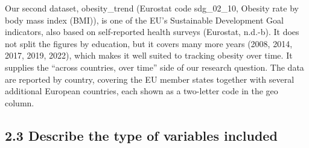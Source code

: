 \documentclass[
]{article}
\begin{document}
Our second dataset, obesity\_trend (Eurostat code sdg\_02\_10, Obesity
rate by body mass index (BMI)), is one of the EU's Sustainable
Development Goal indicators, also based on self-reported health surveys
(Eurostat, n.d.-b). It does not split the figures by education, but it
covers many more years (2008, 2014, 2017, 2019, 2022), which makes it
well suited to tracking obesity over time. It supplies the ``across
countries, over time'' side of our research question. The data are
reported by country, covering the EU member states together with several
additional European countries, each shown as a two-letter code in the
geo column.

\subsection{2.3 Describe the type of variables
included}\label{describe-the-type-of-variables-included}
\end{document}

